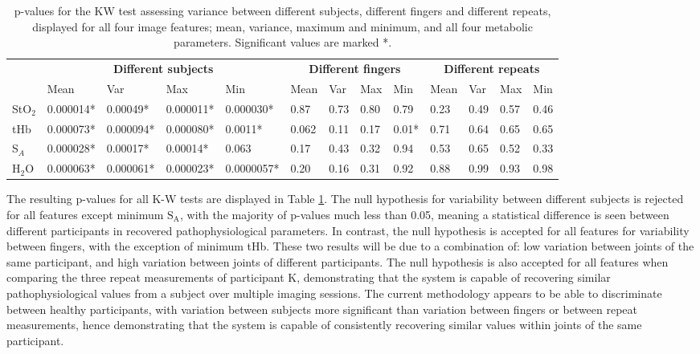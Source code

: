 \documentclass[twoside]{bhamthesis}
\theoremstyle{definition}
\begin{document}
\bgroup
\def\arraystretch{1.4}
\begin{table}[!ht]
\footnotesize
\caption{p-values for the KW test assessing variance between different subjects, different fingers and different repeats, displayed for all four image features; mean, variance, maximum and minimum, and all four metabolic parameters. Significant values are marked *.}
\begin{center}
 \begin{tabular}{|p{0.6cm}|  p{1.4cm} p{1.4cm} p{1.4cm} p{1.4cm}| p{0.6cm} p{0.6cm} p{0.6cm} p{0.6cm}| p{0.5cm} p{0.5cm} p{0.5cm} p{0.5cm}|} 
 \hline 
 & \multicolumn{4}{c|}{\textbf{Different subjects}}  & \multicolumn{4}{c|}{\textbf{Different fingers}} & \multicolumn{4}{c|}{\textbf{Different repeats}}  \\ 
 & Mean & Var & Max & Min & Mean & Var & Max & Min & Mean & Var & Max & Min \\ [1ex] 
 \hline
 StO$_2$ & 0.000014* & 0.00049* & 0.000011* & 0.000030* & 0.87 & 0.73 & 0.80 & 0.79  & 0.23 & 0.49 & 0.57 & 0.46 \\ 
 tHb &  0.000073* & 0.000094* & 0.000080* & 0.0011* & 0.062 & 0.11 & 0.17 & 0.01* & 0.71 & 0.64 & 0.65 & 0.65 \\
 S$_A$ & 0.000028* & 0.00017* & 0.00014* & 0.063  & 0.17 & 0.43 & 0.32 & 0.94 & 0.53 & 0.65 & 0.52 & 0.33 \\
 H$_2$O & 0.000063* & 0.000061* & 0.000023* & 0.0000057*  & 0.20 & 0.16 & 0.31 & 0.92 & 0.88 & 0.99 & 0.93 & 0.98 \\
 \hline
\end{tabular}
\end{center}
\label{Variability_table}
\end{table}

The resulting p-values for all K-W tests are displayed in Table \ref{Variability_table}. The null hypothesis for variability between different subjects is rejected for all features except minimum $\mathrm{S_A}$, with the majority of p-values much less than 0.05, meaning a statistical difference is seen between different participants in recovered pathophysiological parameters. In contrast, the null hypothesis is accepted for all features for variability between fingers, with the exception of minimum tHb. These two results will be due to a combination of: low variation between joints of the same participant, and high variation between joints of different participants. The null hypothesis is also accepted for all features when comparing the three repeat measurements of participant K, demonstrating that the system is capable of recovering similar pathophysiological values from a subject over multiple imaging sessions. The current methodology appears to be able to discriminate between healthy participants, with variation between subjects more significant than variation between fingers or between repeat measurements, hence demonstrating that the system is capable of consistently recovering similar values within joints of the same participant. 
\end{document}
